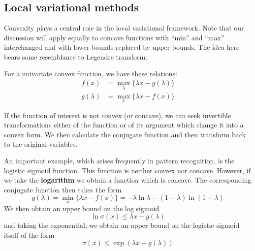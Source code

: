 \documentclass[a4paper]{book}
\begin{document}
\subsection{Local variational methods}\label{localV}
Convexity plays a central role in the local variational framework. Note that our discussion will apply equally to concave functions with ``min'' and ``max'' interchanged and with lower bounds replaced by upper bounds. The idea here bears some resemblance to Legendre transform.

For a univariate convex function, we have these relations:
\begin{align}
	f(x) &= \max_{\lambda} \{ \lambda x - g(\lambda) \} \\	
	g(\lambda) &= \max_{x} \{ \lambda x -f(x)  \}
\end{align}

If the function of interest is not convex (or concave), we can seek invertible transformations either of the function or of its argument which change it into a convex form. We then calculate the conjugate function and then transform back to the original variables.

An important example, which arises frequently in pattern recognition, is the logistic sigmoid function. This function is neither convex nor concave. However, if we take the \textbf{logarithm} we obtain a function which is concave. The corresponding conjugate function then takes the form
\begin{equation}
	g(\lambda) = \min_x \{ \lambda x-f(x) \} = -\lambda \ln \lambda - (1-\lambda) \ln (1- \lambda )
\end{equation}
We then obtain an upper bound on the log sigmoid
\begin{equation}
	\ln \sigma(x) \leq \lambda x - g(\lambda)
\end{equation}
and taking the exponential, we obtain an upper bound on the logistic sigmoid itself of the form
\begin{equation}
	\sigma(x) \leq \exp(\lambda x - g(\lambda))
\end{equation}
\end{document}
